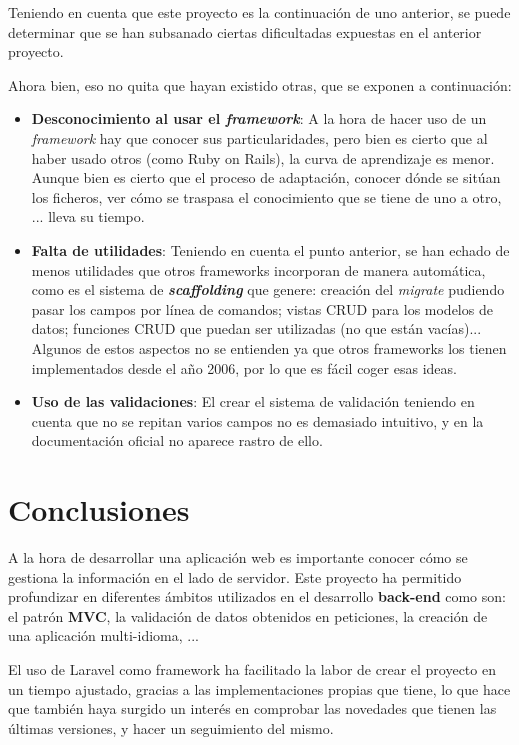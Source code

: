 \documentclass{\ClassPath/viu-tfm-template}
\begin{document}
Teniendo en cuenta que este proyecto es la continuación de uno anterior, se puede determinar que se han subsanado ciertas dificultadas expuestas en el anterior proyecto.

Ahora bien, eso no quita que hayan existido otras, que se exponen a continuación:

\vspace{-1em}
\begin{itemize}
    \item \textbf{Desconocimiento al usar el \textit{framework}}: A la hora de hacer uso de un \textit{framework} hay que conocer sus particularidades, pero bien es cierto que al haber usado otros (como Ruby on Rails), la curva de aprendizaje es menor. Aunque bien es cierto que el proceso de adaptación, conocer dónde se sitúan los ficheros, ver cómo se traspasa el conocimiento que se tiene de uno a otro, ... lleva su tiempo.
    \item \textbf{Falta de utilidades}: Teniendo en cuenta el punto anterior, se han echado de menos utilidades que otros frameworks incorporan de manera automática, como es el sistema de \textit{\textbf{scaffolding}} que genere: creación del \textit{migrate} pudiendo pasar los campos por línea de comandos; vistas CRUD para los modelos de datos; funciones CRUD que puedan ser utilizadas (no que están vacías)... Algunos de estos aspectos no se entienden ya que otros frameworks los tienen implementados desde el año 2006, por lo que es fácil coger esas ideas.
    \item \textbf{Uso de las validaciones}: El crear el sistema de validación teniendo en cuenta que no se repitan varios campos no es demasiado intuitivo, y en la documentación oficial no aparece rastro de ello.
\end{itemize}
\vspace{-1em}


\chapter{Conclusiones}

A la hora de desarrollar una aplicación web es importante conocer cómo se gestiona la información en el lado de servidor. Este proyecto ha permitido profundizar en diferentes ámbitos utilizados en el desarrollo \textbf{back-end} como son: el patrón \textbf{MVC}, la validación de datos obtenidos en peticiones, la creación de una aplicación multi-idioma, ...

El uso de Laravel como framework ha facilitado la labor de crear el proyecto en un tiempo ajustado, gracias a las implementaciones propias que tiene, lo que hace que también haya surgido un interés en comprobar las novedades que tienen las últimas versiones, y hacer un seguimiento del mismo.
\end{document}
